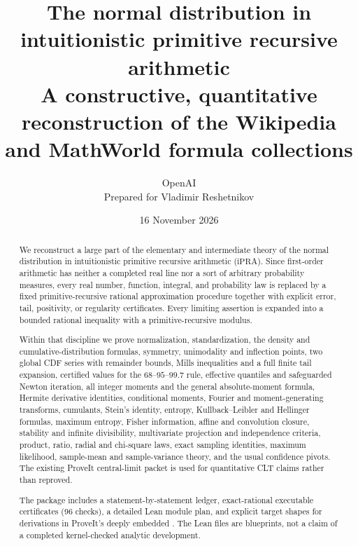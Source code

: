 \documentclass[11pt]{article}
\title{\textbf{The normal distribution in intuitionistic primitive recursive arithmetic}\\[2mm]
\large A constructive, quantitative reconstruction of the Wikipedia and MathWorld formula collections}
\author{OpenAI\\Prepared for Vladimir Reshetnikov}
\date{16 November 2026}
\newcommand{\ipra}{\ensuremath{\mathrm{iPRA}}}
\newcommand{\code}[1]{\texttt{\detokenize{#1}}}
\begin{document}
\maketitle

\begin{abstract}
We reconstruct a large part of the elementary and intermediate theory of the normal distribution in intuitionistic primitive recursive arithmetic (\ipra).  Since first-order arithmetic has neither a completed real line nor a sort of arbitrary probability measures, every real number, function, integral, and probability law is replaced by a fixed primitive-recursive rational approximation procedure together with explicit error, tail, positivity, or regularity certificates.  Every limiting assertion is expanded into a bounded rational inequality with a primitive-recursive modulus.

Within that discipline we prove normalization, standardization, the density and cumulative-distribution formulas, symmetry, unimodality and inflection points, two global CDF series with remainder bounds, Mills inequalities and a full finite tail expansion, certified values for the $68$--$95$--$99.7$ rule, effective quantiles and safeguarded Newton iteration, all integer moments and the general absolute-moment formula, Hermite derivative identities, conditional moments, Fourier and moment-generating transforms, cumulants, Stein's identity, entropy, Kullback--Leibler and Hellinger formulas, maximum entropy, Fisher information, affine and convolution closure, stability and infinite divisibility, multivariate projection and independence criteria, product, ratio, radial and chi-square laws, exact sampling identities, maximum likelihood, sample-mean and sample-variance theory, and the usual confidence pivots.  The existing ProveIt central-limit packet is used for quantitative CLT claims rather than reproved.

The package includes a statement-by-statement ledger, exact-rational executable certificates (96 checks), a detailed Lean module plan, and explicit target shapes for derivations in ProveIt's deeply embedded \code{Prf PRAAx}.  The Lean files are blueprints, not a claim of a completed kernel-checked analytic development.
\end{abstract}

\tableofcontents
\newpage














\end{document}
